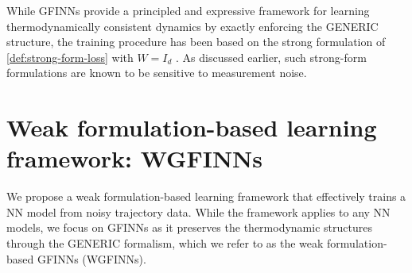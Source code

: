 \documentclass[final]{siamltex}
\newcommand{\jrp}[1]{{\color{orange}{#1}}}
\begin{document}


While GFINNs provide a principled and expressive framework for learning thermodynamically consistent dynamics by exactly enforcing the GENERIC structure, the training procedure has been based on the strong formulation of \eqref{def:strong-form-loss} with $W = I_d$ \cite{zhang2022gfinns,park2024tlasdi,he2026thermodynamically}.
As discussed earlier, such strong-form formulations are known to be sensitive to measurement noise.

% 
\section{Weak formulation-based learning framework: WGFINNs}
\label{sec:method}

We propose a weak formulation-based learning framework that effectively trains a NN model from noisy trajectory data. 
While the framework applies to any NN models, we focus on GFINNs as it preserves the thermodynamic structures through the GENERIC formalism, which we refer to as the weak formulation-based GFINNs (WGFINNs).
\end{document}
